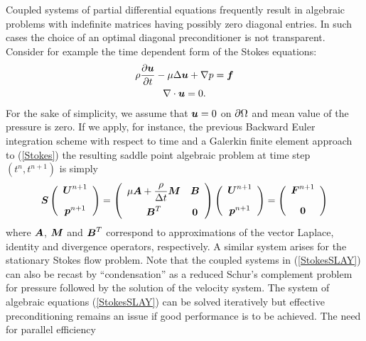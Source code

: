 Coupled systems of partial differential equations frequently
result in algebraic problems with indefinite matrices having
possibly zero diagonal entries. In such cases the choice of an optimal
diagonal preconditioner is not transparent. Consider for example
the time dependent form of the Stokes equations:
\begin{equation}
\label{Stokes}
\begin{array}{c}
     \rho \displaystyle \frac{{\partial} \mbox{{\boldmath $u$}}}{{\partial} t} - \mu \Delta \mbox{{\boldmath $u$}}  + \nabla p =
\mbox{{\boldmath $f$}} \\[1.5ex]
     \nabla \cdot \mbox{{\boldmath $u$}} = 0.
\end{array}
\end{equation}
For the sake of simplicity, we assume that $\mbox{{\boldmath $u$}} = 0$ on ${\partial} \Omega$ and
mean value of the pressure is zero. 
If we apply, for instance, the previous Backward Euler integration scheme
with respect to time and a Galerkin finite element approach to
(\ref{Stokes}) the resulting  saddle point algebraic problem at time 
step $(t^n, t^{n+1})$ is simply
\begin{equation}
\label{StokesSLAY}
\mbox{\boldmath $S$} \left( \begin{array}{c}
       \mbox{\boldmath $U$}^{n+1} \\[2.0ex] \mbox{\boldmath $p$}^{n+1}
   \end{array} \right)
=
\left( \begin{array}{cc}
       \mu \mbox{\boldmath $A$} + \displaystyle \frac{\rho}{\Delta t} \mbox{\boldmath $M$} & \mbox{\boldmath $B$} \\[2.0ex]
       \mbox{\boldmath $B$}^T & \mathbf{0}
\end{array} \right)
\left( \begin{array}{c}
       \mbox{\boldmath $U$}^{n+1} \\[2.0ex] \mbox{\boldmath $p$}^{n+1}
\end{array} \right)
=
\left( \begin{array}{c}
       \mbox{\boldmath $F$}^{n+1} \\[2.0ex] \mathbf{0}
\end{array} \right)
\end{equation}
where $\mbox{\boldmath $A$}$, $\mbox{\boldmath $M$}$ and $\mbox{\boldmath $B$}^T$ correspond to approximations of the vector Laplace, 
identity and divergence operators, respectively. A similar system arises for the 
stationary Stokes flow problem. Note that the coupled systems in (\ref{StokesSLAY}) 
can also be recast by ``condensation'' as a reduced Schur's complement problem for 
pressure followed by the solution of the velocity system.  The system of algebraic equations
(\ref{StokesSLAY}) can be solved iteratively but effective preconditioning remains 
an issue if good performance is to be achieved. The need for parallel efficiency 
